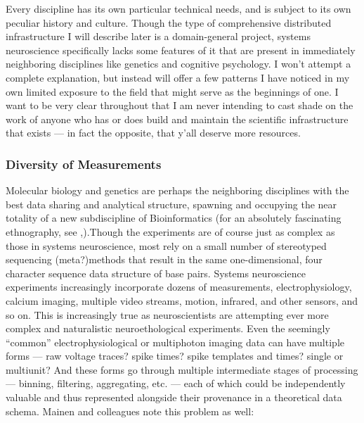 \documentclass{article}
\begin{document}
Every discipline has its own particular technical needs, and is subject
to its own peculiar history and culture. Though the type of
comprehensive distributed infrastructure I will describe later is a
domain-general project, systems neuroscience specifically lacks some
features of it that are present in immediately neighboring disciplines
like genetics and cognitive psychology. I won't attempt a complete
explanation, but instead will offer a few patterns I have noticed in my
own limited exposure to the field that might serve as the beginnings of
one. I want to be very clear throughout that I am never intending to
cast shade on the work of anyone who has or does build and maintain the
scientific infrastructure that exists --- in fact the opposite, that
y'all deserve more resources.

\hypertarget{diversity-of-measurements}{%
\subsubsection{Diversity of
Measurements}\label{diversity-of-measurements}}

Molecular biology and genetics are perhaps the neighboring disciplines
with the best data sharing and analytical structure, spawning and
occupying the near totality of a new subdiscipline of Bioinformatics
(for an absolutely fascinating ethnography, see \cite{bietzCollaborationMetagenomicsSequence2009},).Though the experiments
are of course just as complex as those in systems neuroscience, most
rely on a small number of stereotyped sequencing (meta?)methods that
result in the same one-dimensional, four character sequence data
structure of base pairs. Systems neuroscience experiments increasingly
incorporate dozens of measurements, electrophysiology, calcium imaging,
multiple video streams, motion, infrared, and other sensors, and so on.
This is increasingly true as neuroscientists are attempting ever more
complex and naturalistic neuroethological experiments. Even the
seemingly ``common'' electrophysiological or multiphoton imaging data
can have multiple forms --- raw voltage traces? spike times? spike
templates and times? single or multiunit? And these forms go through
multiple intermediate stages of processing --- binning, filtering,
aggregating, etc. --- each of which could be independently valuable and
thus represented alongside their provenance in a theoretical data
schema. Mainen and colleagues note this problem as well:
\end{document}
